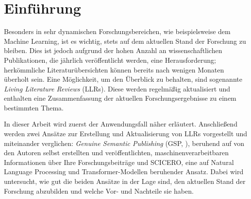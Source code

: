 \section{Einführung}
\label{sec:einfuehrung}

Besonders in sehr dynamischen Forschungsbereichen, wie beispielsweise dem Machine Learning, ist es wichtig, stets auf dem aktuellen Stand der Forschung zu bleiben.
Dies ist jedoch aufgrund der hohen Anzahl an wissenschaftlichen Publikationen, die jährlich veröffentlicht werden, eine Herausforderung; herkömmliche Literaturübersichten können bereits nach wenigen Monaten überholt sein.
Eine Möglichkeit, um den Überblick zu behalten, sind sogenannte \textit{Living Literature Reviews} (LLRs).
Diese werden regelmäßig aktualisiert und enthalten eine Zusammenfassung der aktuellen Forschungsergebnisse zu einem bestimmten Thema.

In dieser Arbeit wird zuerst der Anwendungsfall näher erläutert.
Anschließend werden zwei Ansätze zur Erstellung und Aktualisierung von LLRs vorgestellt und miteinander verglichen:
\textit{Genuine Semantic Publishing} (GSP, \cite{kuhn2017genuine}), beruhend auf von den Autoren selbst erstellten und veröffentlichten, maschinenverarbeitbaren Informationen über Ihre Forschungsbeiträge und SCICERO, eine auf Natural Language Processing und Transformer-Modellen beruhender Ansatz.
Dabei wird untersucht, wie gut die beiden Ansätze in der Lage sind, den aktuellen Stand der Forschung abzubilden und welche Vor- und Nachteile sie haben.
